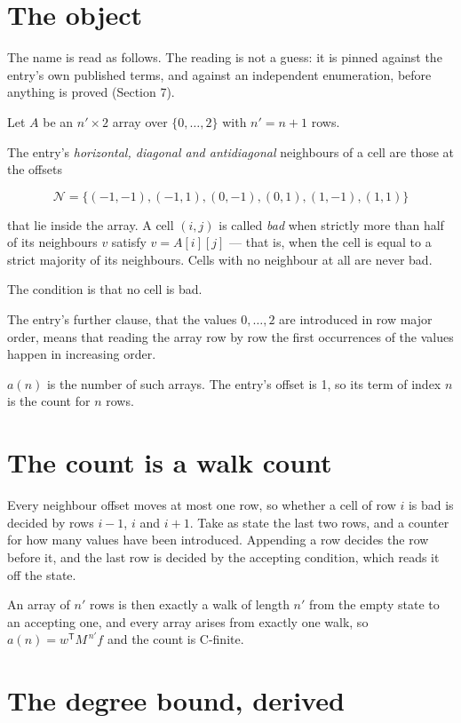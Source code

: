\documentclass[11pt]{article}
\theoremstyle{definition}
\begin{document}
\section{The object}

The name is read as follows. The reading is not a guess: it is pinned against the entry's own published terms, and against an independent enumeration, before anything is proved (Section 7).

Let $A$ be an $n' \times 2$ array over $\{0,\dots,2\}$ with $n' = n + 1$ rows.

The entry's {\itshape horizontal, diagonal and antidiagonal} neighbours of a cell are those at the offsets

\[\mathcal{N} = \{(-1,-1), (-1,1), (0,-1), (0,1), (1,-1), (1,1)\}\]

that lie inside the array. A cell $(i,j)$ is called {\itshape bad} when strictly more than half of its neighbours $v$ satisfy $v = A[i][j]$ --- that is, when the cell is equal to a strict majority of its neighbours. Cells with no neighbour at all are never bad.

The condition is that no cell is bad.

The entry's further clause, that the values $0,\dots,2$ are introduced in row major order, means that reading the array row by row the first occurrences of the values happen in increasing order.

$a(n)$ is the number of such arrays. The entry's offset is 1, so its term of index $n$ is the count for $n$ rows.

\section{The count is a walk count}

Every neighbour offset moves at most one row, so whether a cell of row $i$ is bad is decided by rows $i-1$, $i$ and $i+1$. Take as state the last two rows, and a counter for how many values have been introduced. Appending a row decides the row before it, and the last row is decided by the accepting condition, which reads it off the state.

An array of $n'$ rows is then exactly a walk of length $n'$ from the empty state to an accepting one, and every array arises from exactly one walk, so $a(n) = w^{\mathsf T}M^{\,n'}f$ and the count is C-finite.

\section{The degree bound, derived}
\end{document}
